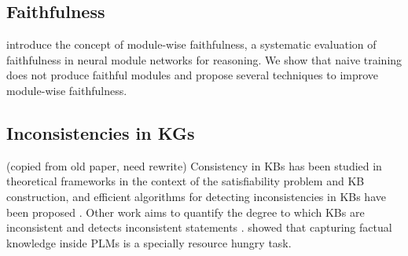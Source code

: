 \documentclass[11pt]{article}
\newcommand{\eat}[1]{}
\begin{document}
\subsection{Faithfulness}
\citet{subramanian-etal-2020-obtaining}
introduce the concept of module-wise faithfulness, a systematic evaluation of faithfulness in neural module networks for reasoning. We show that naive training does not produce faithful modules and propose several techniques to improve module-wise faithfulness. 

\eat{Work on \textbf{consistency in other domains}
includes \citep{du2019consistent} where  prediction
consistency in procedural text is improved. \citet{ribeiro-etal-2020-beyond} use consistency for more robust evaluation. \citet{li-etal-2019-logic} measure and mitigate inconsistency in natural language inference (NLI), and finally, \citet{camburu2020make} propose a method for measuring inconsistencies in NLI explanations \cite{camburu2018snli}.}

\eat{
\subsection{PLMs and KGs}
\subsection{Knowledge Graph Identification}
\citet{Pujara2013KnowledgeGI}
use probabilistic soft logic (PSL) \cite{Broecheler2010ProbabilisticSL}.
}

\subsection{Inconsistencies in KGs}
(copied from old paper, need rewrite)
Consistency in KBs has been
studied in theoretical frameworks in the context of the
satisfiability problem and KB construction, and efficient
algorithms for detecting inconsistencies in KBs have been
proposed \cite{hansen2000probabilistic,andersen2001easy}.
Other work aims to quantify the degree to which KBs are
inconsistent and detects inconsistent statements
\cite{Thimm:2009d,muino2011measuring,Thimm:2013}.
\cite{zhang2020need} showed that capturing factual knowledge inside PLMs is a specially resource hungry task.
\end{document}
